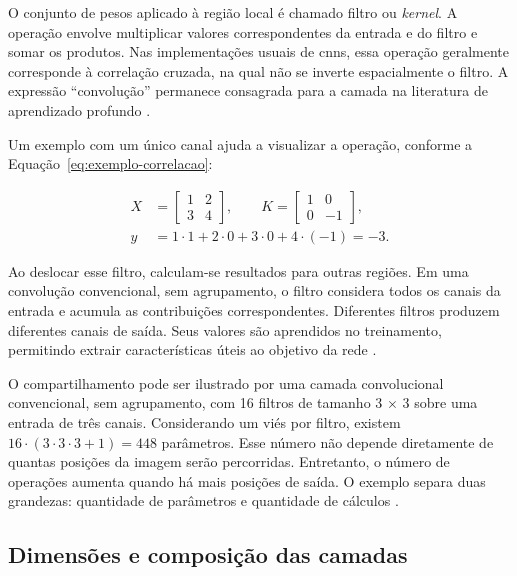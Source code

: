 O conjunto de pesos aplicado à região local é chamado filtro ou \textit{kernel}. A operação envolve multiplicar valores correspondentes da entrada e do filtro e somar os produtos. Nas implementações usuais de \glspl{cnn}, essa operação geralmente corresponde à correlação cruzada, na qual não se inverte espacialmente o filtro. A expressão ``convolução'' permanece consagrada para a camada na literatura de aprendizado profundo \cite{dumoulin}.

Um exemplo com um único canal ajuda a visualizar a operação, conforme a Equação~\ref{eq:exemplo-correlacao}:

\begin{equation}
    \label{eq:exemplo-correlacao}
    \begin{aligned}
        X &= \begin{bmatrix}1 & 2 \\ 3 & 4\end{bmatrix},
        \qquad K = \begin{bmatrix}1 & 0 \\ 0 & -1\end{bmatrix}, \\
        y &= 1\cdot 1 + 2\cdot 0 + 3\cdot 0 + 4\cdot(-1) = -3.
    \end{aligned}
\end{equation}

Ao deslocar esse filtro, calculam-se resultados para outras regiões. Em uma convolução convencional, sem agrupamento, o filtro considera todos os canais da entrada e acumula as contribuições correspondentes. Diferentes filtros produzem diferentes canais de saída. Seus valores são aprendidos no treinamento, permitindo extrair características úteis ao objetivo da rede \cite{stanford-cnn}.

O compartilhamento pode ser ilustrado por uma camada convolucional convencional, sem agrupamento, com 16 filtros de tamanho 3 \(\times\) 3 sobre uma entrada de três canais. Considerando um viés por filtro, existem \(16\cdot(3\cdot 3\cdot 3+1)=448\) parâmetros. Esse número não depende diretamente de quantas posições da imagem serão percorridas. Entretanto, o número de operações aumenta quando há mais posições de saída. O exemplo separa duas grandezas: quantidade de parâmetros e quantidade de cálculos \cite{lecun-1998}.

\subsection{Dimensões e composição das camadas}
\label{subsec:dimensoes-camadas}

